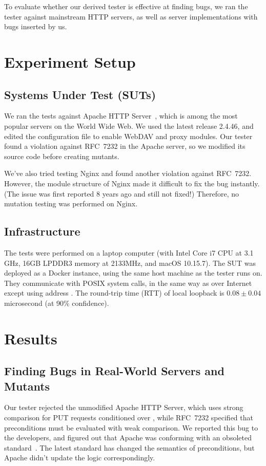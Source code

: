 To evaluate whether our derived tester is effective at finding bugs, we ran the
tester against mainstream HTTP servers, as well as server implementations with
bugs inserted by us.

\section{Experiment Setup}
\subsection{Systems Under Test (SUTs)}
We ran the tests against Apache HTTP Server~\cite{Apache}, which is among the
most popular servers on the World Wide Web.  We used the latest release 2.4.46,
and edited the configuration file to enable WebDAV and proxy modules.  Our
tester found a violation against RFC~7232 in the Apache server, so we modified
its source code before creating mutants.

We've also tried testing Nginx and found another violation against RFC~7232.
However, the module structure of Nginx made it difficult to fix the bug
instantly.  (The issue was first reported 8 years ago and still not fixed!)
Therefore, no mutation testing was performed on Nginx.

\subsection{Infrastructure}
The tests were performed on a laptop computer (with Intel Core i7 CPU at 3.1
GHz, 16GB LPDDR3 memory at 2133MHz, and macOS 10.15.7).  The SUT was deployed
as a Docker instance, using the same host machine as the tester runs on.  They
communicate with POSIX system calls, in the same way as over Internet except
using address .  The round-trip time (RTT) of local loopback
is $0.08\pm0.04$ microsecond (at 90\% confidence).

\section{Results}
\label{sec:eval-performance}
\subsection{Finding Bugs in Real-World Servers and Mutants}
Our tester rejected the unmodified Apache HTTP Server, which uses strong
comparison for PUT requests conditioned over , while RFC~7232
specified that  preconditions must be evaluated with weak
comparison.  We reported
this bug to the developers, and figured out that Apache was conforming with an
obsoleted \http standard~\cite{rfc2616}.  The latest standard has changed the
semantics of  preconditions, but Apache didn't update the
logic correspondingly.

